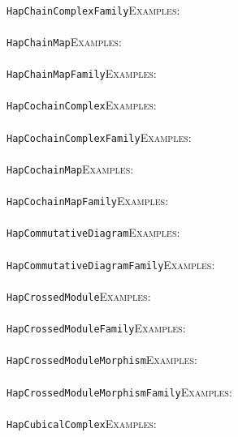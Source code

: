 \documentclass[a4paper,11pt]{report}
\begin{document}
{{ \\
 \texttt{HapChainComplexFamily}{\nobreakspace}{\nobreakspace}{\nobreakspace}{\nobreakspace}\textsc{Examples:} \\
 \\
 \texttt{HapChainMap}{\nobreakspace}{\nobreakspace}{\nobreakspace}{\nobreakspace}\textsc{Examples:} \\
 \\
 \texttt{HapChainMapFamily}{\nobreakspace}{\nobreakspace}{\nobreakspace}{\nobreakspace}\textsc{Examples:} \\
 \\
 \texttt{HapCochainComplex}{\nobreakspace}{\nobreakspace}{\nobreakspace}{\nobreakspace}\textsc{Examples:} \\
 \\
 \texttt{HapCochainComplexFamily}{\nobreakspace}{\nobreakspace}{\nobreakspace}{\nobreakspace}\textsc{Examples:} \\
 \\
 \texttt{HapCochainMap}{\nobreakspace}{\nobreakspace}{\nobreakspace}{\nobreakspace}\textsc{Examples:} \\
 \\
 \texttt{HapCochainMapFamily}{\nobreakspace}{\nobreakspace}{\nobreakspace}{\nobreakspace}\textsc{Examples:} \\
 \\
 \texttt{HapCommutativeDiagram}{\nobreakspace}{\nobreakspace}{\nobreakspace}{\nobreakspace}\textsc{Examples:} \\
 \\
 \texttt{HapCommutativeDiagramFamily}{\nobreakspace}{\nobreakspace}{\nobreakspace}{\nobreakspace}\textsc{Examples:} \\
 \\
 \texttt{HapCrossedModule}{\nobreakspace}{\nobreakspace}{\nobreakspace}{\nobreakspace}\textsc{Examples:} \\
 \\
 \texttt{HapCrossedModuleFamily}{\nobreakspace}{\nobreakspace}{\nobreakspace}{\nobreakspace}\textsc{Examples:} \\
 \\
 \texttt{HapCrossedModuleMorphism}{\nobreakspace}{\nobreakspace}{\nobreakspace}{\nobreakspace}\textsc{Examples:} \\
 \\
 \texttt{HapCrossedModuleMorphismFamily}{\nobreakspace}{\nobreakspace}{\nobreakspace}{\nobreakspace}\textsc{Examples:} \\
 \\
 \texttt{HapCubicalComplex}{\nobreakspace}{\nobreakspace}{\nobreakspace}{\nobreakspace}\textsc{Examples:} \\
}}
\end{document}
